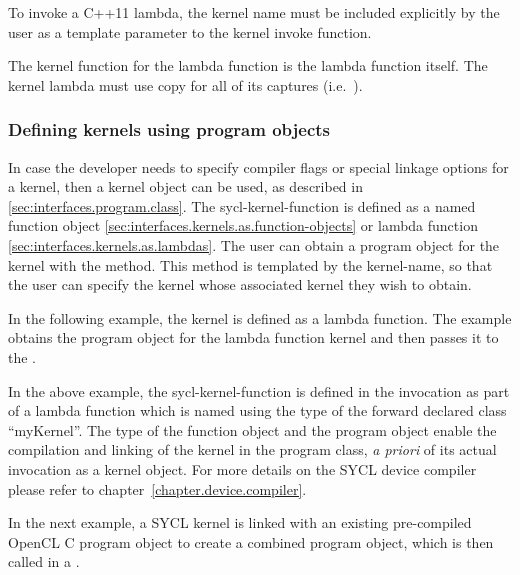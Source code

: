 To invoke a C++11 lambda, the kernel name must be included explicitly by the
user as a template parameter to the kernel invoke function.

The kernel function for the lambda function is the lambda function itself.
The kernel lambda must use copy for all of its captures (i.e.\ \tf{[=]}).



\subsubsection{Defining kernels using program objects}

In case the developer needs to specify compiler flags or special linkage options
for a kernel, then a kernel object can be used, as described in
\ref{sec:interfaces.program.class}. The \gls{sycl-kernel-function} is defined
as a named function object
\ref{sec:interfaces.kernels.as.function-objects} or lambda function
\ref{sec:interfaces.kernels.as.lambdas}. The user can obtain a program
object for the kernel with the  method. This
method is templated by the \gls{kernel-name}, so that the user
can specify the kernel whose associated kernel they wish to obtain.

In the following example, the kernel is defined as a lambda function.
The example obtains the program object for the lambda function kernel
and then passes it to the .



In the above example, the \gls{sycl-kernel-function} is defined in the
 invocation as part of a lambda function which is named
using the type of the forward declared class ``myKernel''. The type of the
function object and the program object enable the compilation and linking of the kernel
in the program class, \emph{a priori} of its actual invocation as a kernel
object. For more details on the SYCL device compiler please refer to
chapter~\ref{chapter.device.compiler}.

In the next example, a SYCL kernel is linked with an existing pre-compiled
OpenCL C program object to create a combined program object, which is then
called in a .

